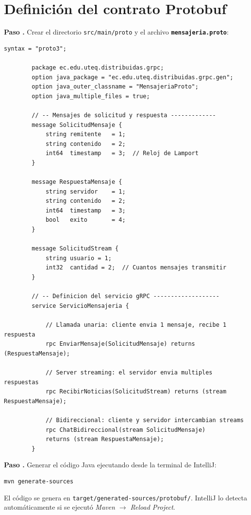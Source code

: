\documentclass[12pt, a4paper, openany]{book}
\newcounter{paso}[section]
\newcommand{\paso}[1]{%
	\stepcounter{paso}%
	\medskip\noindent
	\begin{tcolorbox}[enhanced, colback=white, colframe=practiceBlue,
		boxrule=0.8pt, arc=3pt, left=6pt, right=6pt, top=4pt, bottom=4pt,
		before upper={\noindent}]
		\textcolor{practiceBlue}{\textbf{Paso \arabic{paso}.}} #1
	\end{tcolorbox}%
}
\newcommand{\code}[1]{\texttt{\small#1}}
\newcommand{\archivo}[1]{\texttt{\textbf{#1}}}
\newcommand{\menu}[1]{\textit{#1}}
\begin{document}
	\section{Definición del contrato Protobuf}
	
	\paso{Crear el directorio \code{src/main/proto} y el archivo
		\archivo{mensajeria.proto}:}
	
	\begin{lstlisting}[style=ProtoStyle, caption={mensajeria.proto --- Definición del servicio gRPC}]
		syntax = "proto3";
		
		package ec.edu.uteq.distribuidas.grpc;
		option java_package = "ec.edu.uteq.distribuidas.grpc.gen";
		option java_outer_classname = "MensajeriaProto";
		option java_multiple_files = true;
		
		// -- Mensajes de solicitud y respuesta -------------
		message SolicitudMensaje {
			string remitente   = 1;
			string contenido   = 2;
			int64  timestamp   = 3;  // Reloj de Lamport
		}
		
		message RespuestaMensaje {
			string servidor    = 1;
			string contenido   = 2;
			int64  timestamp   = 3;
			bool   exito       = 4;
		}
		
		message SolicitudStream {
			string usuario = 1;
			int32  cantidad = 2;  // Cuantos mensajes transmitir
		}
		
		// -- Definicion del servicio gRPC -------------------
		service ServicioMensajeria {
			
			// Llamada unaria: cliente envia 1 mensaje, recibe 1 respuesta
			rpc EnviarMensaje(SolicitudMensaje) returns (RespuestaMensaje);
			
			// Server streaming: el servidor envia multiples respuestas
			rpc RecibirNoticias(SolicitudStream) returns (stream RespuestaMensaje);
			
			// Bidireccional: cliente y servidor intercambian streams
			rpc ChatBidireccional(stream SolicitudMensaje)
			returns (stream RespuestaMensaje);
		}
	\end{lstlisting}
	
	\paso{Generar el código Java ejecutando desde la terminal de IntelliJ:}
	
	\begin{lstlisting}[style=BashStyle]
		mvn generate-sources
	\end{lstlisting}
	
	El código se genera en \code{target/generated-sources/protobuf/}.
	IntelliJ lo detecta automáticamente si se ejecutó \menu{Maven $\to$ Reload Project}.
	
\end{document}
